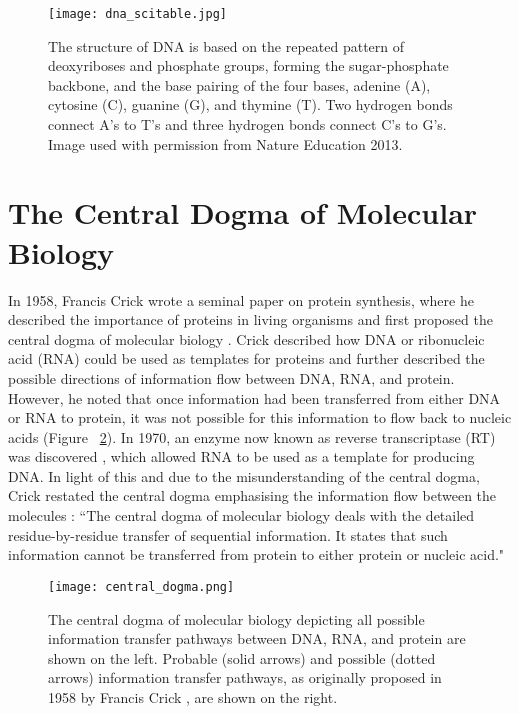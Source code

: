 \begin{figure}[!ht]
   \centering
   \texttt{[image: dna\_scitable.jpg]}
   \caption[DNA base pairing]{The structure of DNA is based on the repeated pattern of deoxyriboses and phosphate groups, forming the sugar-phosphate backbone, and the base pairing of the four bases, adenine (A), cytosine (C), guanine (G), and thymine (T). Two hydrogen bonds connect A's to T's and three hydrogen bonds connect C's to G's. Image used with permission from Nature Education 2013.}
   \label{fig:dna}
\end{figure}

\section{The Central Dogma of Molecular Biology}
\label{sec:central_dogma}

In 1958, Francis Crick wrote a seminal paper on protein synthesis, where he described the importance of proteins in living organisms and first proposed the central dogma of molecular biology \citep{crick1958protein}. Crick described how DNA or ribonucleic acid (RNA) could be used as templates for proteins and further described the possible directions of information flow between DNA, RNA, and protein. However, he noted that once information had been transferred from either DNA or RNA to protein, it was not possible for this information to flow back to nucleic acids (Figure ~\ref{fig:central_dogma}). In 1970, an enzyme now known as reverse transcriptase (RT) was discovered \citep{pmid4316301,pmid4316300}, which allowed RNA to be used as a template for producing DNA. In light of this and due to the misunderstanding of the central dogma, Crick restated the central dogma emphasising the information flow between the molecules \citep{CRICK1970}: ``The central dogma of molecular biology deals with the detailed residue-by-residue transfer of sequential information. It states that such information cannot be transferred from protein to either protein or nucleic acid."

\begin{figure}[!ht]
   \centering
   \texttt{[image: central\_dogma.png]}
   \caption[The central dogma]{The central dogma of molecular biology depicting all possible information transfer pathways between DNA, RNA, and protein are shown on the left. Probable (solid arrows) and possible (dotted arrows) information transfer pathways, as originally proposed in 1958 by Francis Crick \citep{crick1958protein}, are shown on the right.}
   \label{fig:central_dogma}
\end{figure}

